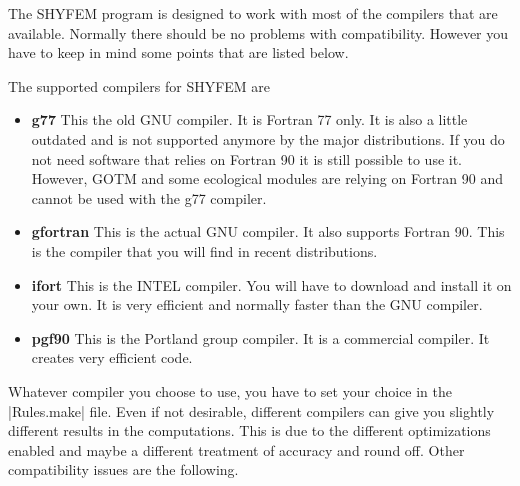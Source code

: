 
The SHYFEM program is designed to work with most of the compilers
that are available. Normally there should be no problems with
compatibility. However you have to keep in mind some points that are
listed below.

The supported compilers for SHYFEM are

\begin{itemize}

\item {\bf g77} This the old GNU compiler. It is Fortran 77 only. It
is also a little outdated and is not supported anymore by the major
distributions. If you do not need software that relies on Fortran 90 it
is still possible to use it. However, GOTM and some ecological modules
are relying on Fortran 90 and cannot be used with the g77 compiler.

\item {\bf gfortran} This is the actual GNU compiler. It also
supports Fortran 90. This is the compiler that you will find in recent
distributions.

\item {\bf ifort} This is the INTEL compiler. You will have to download
and install it on your own. It is very efficient and normally faster
than the GNU compiler.

\item {\bf pgf90} This is the Portland group compiler. It is a commercial
compiler. It creates very efficient code.

\end{itemize}

Whatever compiler you choose to use, you have to set your choice in
the |Rules.make| file. Even if not desirable, different compilers can
give you slightly different results in the computations. This is due to
the different optimizations enabled and maybe a different treatment of
accuracy and round off. Other compatibility issues are the following.

